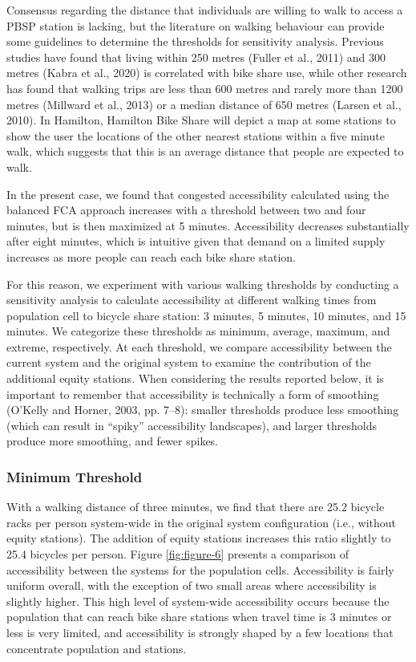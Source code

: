 \documentclass[]{elsarticle} %
\begin{document}
Consensus regarding the distance that individuals are willing to walk to
access a PBSP station is lacking, but the literature on walking
behaviour can provide some guidelines to determine the thresholds for
sensitivity analysis. Previous studies have found that living within 250
metres (Fuller et al., 2011) and 300 metres (Kabra et al., 2020) is
correlated with bike share use, while other research has found that
walking trips are less than 600 metres and rarely more than 1200 metres
(Millward et al., 2013) or a median distance of 650 metres (Larsen et
al., 2010). In Hamilton, Hamilton Bike Share will depict a map at some
stations to show the user the locations of the other nearest stations
within a five minute walk, which suggests that this is an average
distance that people are expected to walk.

In the present case, we found that congested accessibility calculated
using the balanced FCA approach increases with a threshold between two
and four minutes, but is then maximized at 5 minutes. Accessibility
decreases substantially after eight minutes, which is intuitive given
that demand on a limited supply increases as more people can reach each
bike share station.

For this reason, we experiment with various walking thresholds by
conducting a sensitivity analysis to calculate accessibility at
different walking times from population cell to bicycle share station: 3
minutes, 5 minutes, 10 minutes, and 15 minutes. We categorize these
thresholds as minimum, average, maximum, and extreme, respectively. At
each threshold, we compare accessibility between the current system and
the original system to examine the contribution of the additional equity
stations. When considering the results reported below, it is important
to remember that accessibility is technically a form of smoothing
(O'Kelly and Horner, 2003, pp. 7--8): smaller thresholds produce less
smoothing (which can result in ``spiky'' accessibility landscapes), and
larger thresholds produce more smoothing, and fewer spikes.

\hypertarget{minimum-threshold}{%
\subsubsection{Minimum Threshold}\label{minimum-threshold}}

With a walking distance of three minutes, we find that there are 25.2
bicycle racks per person system-wide in the original system
configuration (i.e., without equity stations). The addition of equity
stations increases this ratio slightly to 25.4 bicycles per person.
Figure \ref{fig:figure-6} presents a comparison of accessibility between
the systems for the population cells. Accessibility is fairly uniform
overall, with the exception of two small areas where accessibility is
slightly higher. This high level of system-wide accessibility occurs
because the population that can reach bike share stations when travel
time is 3 minutes or less is very limited, and accessibility is strongly
shaped by a few locations that concentrate population and stations.
\end{document}
